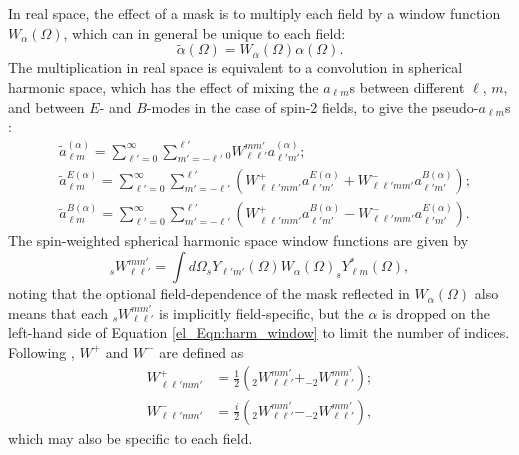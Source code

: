 In real space, the effect of a mask is to multiply each field by a window function $W_\alpha \left( \Omega \right)$, which can in general be unique to each field:
\begin{equation}
    \widetilde{\alpha} \left( \Omega \right) = W_\alpha \left( \Omega \right) \alpha \left( \Omega \right).
\end{equation}
The multiplication in real space is equivalent to a convolution in spherical harmonic space, which has the effect of mixing the $a_{\ell m}$s between different $\ell$, $m$, and between $E$- and $B$-modes in the case of spin-2 fields, to give the pseudo-$a_{\ell m}$s \citep{Lewis2001, Brown2005}:
\begin{align}
    &\widetilde{a}_{\ell m}^{\left( \alpha \right)} =
    \sum_{\ell' = 0}^\infty \sum_{m' = -\ell'}^{\ell'}
    {}_0W_{\ell \ell'}^{m m'} a^{\left( \alpha \right)}_{\ell' m'};
    \label{el_Eqn:pseudo_alm_spin0}
    \\
    &\widetilde{a}_{\ell m}^{E \left( \alpha \right)} =
    \sum_{\ell' = 0}^\infty \sum_{m' = -\ell'}^{\ell'} \left(
    W^+_{\ell \ell' m m'} a^{E \left( \alpha \right)}_{\ell' m'}
    + W^-_{\ell \ell' m m'} a^{B \left( \alpha \right)}_{\ell' m'}
    \right);
    \label{el_Eqn:pseudo_alm_emode}
    \\
    &\widetilde{a}_{\ell m}^{B \left( \alpha \right)} =
    \sum_{\ell' = 0}^\infty \sum_{m' = -\ell'}^{\ell'} \left(
    W^+_{\ell \ell' m m'} a^{B \left( \alpha \right)}_{\ell' m'}
    - W^-_{\ell \ell' m m'} a^{E \left( \alpha \right)}_{\ell' m'}
    \right).
    \label{el_Eqn:pseudo_alm_bmode}
\end{align}
The spin-weighted spherical harmonic space window functions are given by
\begin{equation}
    _sW_{\ell \ell'}^{m m'} = \int d\Omega
    _sY_{\ell' m'} \left( \Omega \right) W_\alpha \left( \Omega \right) _sY_{\ell m}^* \left( \Omega \right),
    \label{el_Eqn:harm_window}
\end{equation}
noting that the optional field-dependence of the mask reflected in $W_\alpha \left( \Omega \right)$ also means that each $_sW_{\ell \ell'}^{m m'}$ is implicitly field-specific, but the $\alpha$ is dropped on the left-hand side of Equation \eqref{el_Eqn:harm_window} to limit the number of indices. Following \citet{Brown2005}, $W^+$ and $W^-$ are defined as
\begin{align}
W_{\ell \ell' m m'}^+ &=
\frac{1}{2} \left( _2W_{\ell \ell'}^{m m'} + _{-2}W_{\ell \ell'}^{m m'} \right); \\
W_{\ell \ell' m m'}^- &=
\frac{i}{2} \left( _2W_{\ell \ell'}^{m m'} - _{-2}W_{\ell \ell'}^{m m'} \right),
\end{align}
which may also be specific to each field.

